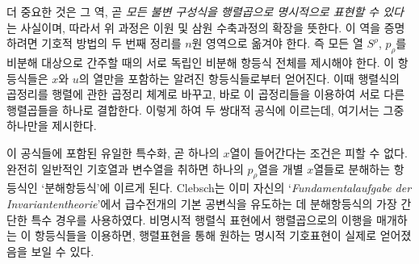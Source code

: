 
더 중요한 것은 그 역, 곧 \emph{모든 불변 구성식을 행렬곱으로 명시적으로 표현할 수 있다}는 사실이며, 따라서 위 과정은 이원 및 삼원 수축과정의 확장을 뜻한다. 이 역을 증명하려면 기호적 방법의 두 번째 정리를 \(n\)원 영역으로 옮겨야 한다. 즉 모든 열 \(S^\rho\), \(p_\rho\)를 비분해 대상으로 간주할 때의 서로 독립인 비분해 항등식 전체를 제시해야 한다. 이 항등식들은 \(x\)와 \(u\)의 열만을 포함하는 알려진 항등식들로부터 얻어진다. 이때 행렬식의 곱정리를 행렬에 관한 곱정리 체계로 바꾸고, 바로 이 곱정리들을 이용하여 서로 다른 행렬곱들을 하나로 결합한다. 이렇게 하여 두 쌍대적 공식에 이르는데, 여기서는 그중 하나만을 제시한다.

이 공식들에 포함된 유일한 특수화, 곧 하나의 \(x\)열이 들어간다는 조건은 피할 수 없다. 완전히 일반적인 기호열과 변수열을 취하면 하나의 \(p_\rho\)열을 개별 \(x\)열들로 분해하는 항등식인 ‘분해항등식’에 이르게 된다. Clebsch는 이미 자신의 ‘\emph{Fundamentalaufgabe der Invariantentheorie}’에서 급수전개의 기본 공변식을 유도하는 데 분해항등식의 가장 간단한 특수 경우를 사용하였다. 비명시적 행렬식 표현에서 행렬곱으로의 이행을 매개하는 이 항등식들을 이용하면, 행렬표현을 통해 원하는 명시적 기호표현이 실제로 얻어졌음을 보일 수 있다.

